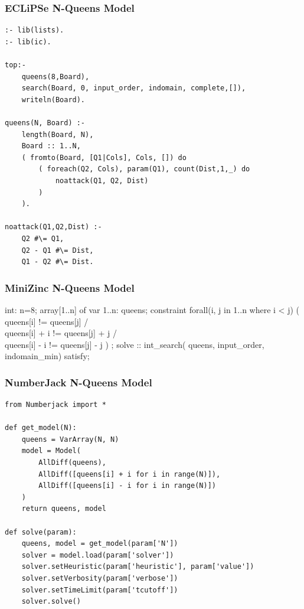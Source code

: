 \begin{frame}[fragile]
\frametitle{ECLiPSe N-Queens Model}
\label{nqueens:eclipse}
\tiny
\begin{verbatim}
:- lib(lists).
:- lib(ic).

top:-
    queens(8,Board),
    search(Board, 0, input_order, indomain, complete,[]),
	writeln(Board).
    
queens(N, Board) :-
    length(Board, N),
    Board :: 1..N,
    ( fromto(Board, [Q1|Cols], Cols, []) do
        ( foreach(Q2, Cols), param(Q1), count(Dist,1,_) do
            noattack(Q1, Q2, Dist)
        )
    ).

noattack(Q1,Q2,Dist) :-
    Q2 #\= Q1,
    Q2 - Q1 #\= Dist,
    Q1 - Q2 #\= Dist.
\end{verbatim}
\hyperlink{nqueens:continue}{}
\end{frame}


\begin{frame}[fragile]
  \frametitle{MiniZinc N-Queens Model}
  \label{nqueens:minizinc}
  \tiny
  \begin{semiverbatim}
int: n=8;
array[1..n] of var 1..n: queens;
constraint
    forall(i, j in 1..n where i < j) (
         queens[i] != queens[j] /\\
         queens[i] + i != queens[j] + j /\\
         queens[i] - i != queens[j] - j
    )
 ;
solve :: int\_search(
        queens,
        input\_order,
        indomain\_min)
        satisfy;
  \end{semiverbatim}
\hyperlink{nqueens:continue}{}
\end{frame}

\begin{frame}[fragile]
\frametitle{NumberJack N-Queens Model}
\label{nqueens:numberjack}
\tiny
\begin{verbatim}
from Numberjack import *
 
def get_model(N):
    queens = VarArray(N, N)
    model = Model(
        AllDiff(queens),
        AllDiff([queens[i] + i for i in range(N)]),
        AllDiff([queens[i] - i for i in range(N)])
    )
    return queens, model
 
def solve(param):
    queens, model = get_model(param['N'])
    solver = model.load(param['solver'])
    solver.setHeuristic(param['heuristic'], param['value'])
    solver.setVerbosity(param['verbose'])
    solver.setTimeLimit(param['tcutoff'])
    solver.solve()
\end{verbatim}
\hyperlink{nqueens:continue}{}
\end{frame}

